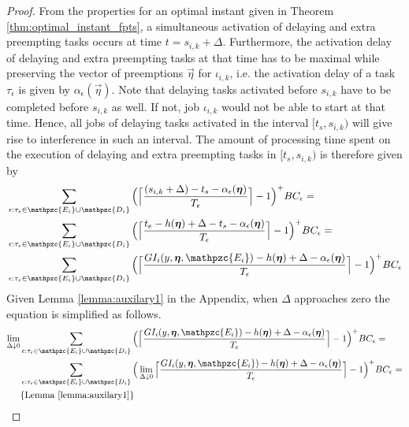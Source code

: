 \begin{proof}
	
	From the properties for an optimal instant given in Theorem \ref{thm:optimal_instant_fpts}, a simultaneous activation of delaying and extra preempting tasks occurs at time $t= s_{i,k}+\Delta$. Furthermore, the activation delay of delaying and extra preempting tasks at that time has to be maximal while preserving the vector of preemptions $\vec{\eta}$ for $\iota_{i,k}$, i.e. the activation delay of a task $\tau_{\epsilon}$ is given by $\alpha_\epsilon(\vec{\eta})$. Note that delaying tasks activated before $s_{i,k}$ have to be completed before $s_{i,k}$ as well. If not, job $\iota_{i,k}$ would not be able to start at that time. Hence, all jobs of delaying tasks activated in the interval $[t_s,s_{i,k})$ will give rise to interference in such an interval. The amount of processing time spent on the execution of delaying and extra preempting tasks in $[t_s,s_{i,k})$ is therefore given by
	\begin{align*}
	&\sum\limits_{\epsilon:\tau_{\epsilon} \in \mathpzc{E_i} \cup \mathpzc{D_i}} \Big( \Big\lceil  \dfrac{(s_{i,k}+\Delta)-t_s-\alpha_\epsilon(\vec{\eta})}{T_\epsilon}\Big\rceil -1 \Big)^+  BC_\epsilon = \\
	&\sum\limits_{\epsilon:\tau_{\epsilon} \in \mathpzc{E_i} \cup \mathpzc{D_i}} \Big( \Big\lceil  \dfrac{t_e -h(\vec{\eta})+\Delta-t_s-\alpha_\epsilon(\vec{\eta})}{T_\epsilon}\Big\rceil -1 \Big)^+  BC_\epsilon = \\
	&\sum\limits_{\epsilon:\tau_{\epsilon} \in \mathpzc{E_i} \cup \mathpzc{D_i}} \Big( \Big\lceil  \dfrac{GI_i(y, \vec{\eta},  \mathpzc{E_i})-h(\vec{\eta})+\Delta- \alpha_\epsilon(\vec{\eta})}{T_\epsilon}\Big\rceil -1 \Big)^+  BC_\epsilon 
	\end{align*}
	Given Lemma \ref{lemma:auxilary1} in the Appendix, when $\Delta$ approaches zero the equation is simplified as follows.
	\begin{align*}
	\lim \limits_{\Delta \downarrow 0} & \sum\limits_{\epsilon:\tau_{\epsilon} \in \mathpzc{E_i} \cup \mathpzc{D_i}} \Big( \Big\lceil  \dfrac{GI_i(y, \vec{\eta},  \mathpzc{E_i})-h(\vec{\eta})+\Delta-\alpha_\epsilon(\vec{\eta})}{T_\epsilon}\Big\rceil -1 \Big)^+  BC_\epsilon 
	= \\
	&\sum\limits_{\epsilon:\tau_{\epsilon} \in \mathpzc{E_i} \cup \mathpzc{D_i}} \Big( \lim \limits_{\Delta \downarrow 0}  \Big\lceil  \dfrac{GI_i(y, \vec{\eta},  \mathpzc{E_i})-h(\vec{\eta})+\Delta-\alpha_\epsilon(\vec{\eta})}{T_\epsilon}\Big\rceil -1 \Big)^+  BC_\epsilon 
	= \\
	& \{ \text{Lemma \ref{lemma:auxilary1}} \} \\ 

\end{align*}
\end{proof}
